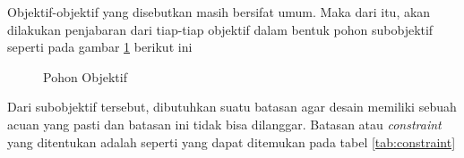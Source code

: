     Objektif-objektif yang disebutkan masih bersifat umum. Maka dari itu, akan dilakukan penjabaran dari tiap-tiap objektif dalam bentuk
    pohon subobjektif seperti pada gambar \ref{fig:obj_tree} berikut ini
    \begin{figure}[tbh]
        \centering
        
        \caption{Pohon Objektif}\label{fig:obj_tree}
    \end{figure}




    Dari subobjektif tersebut, dibutuhkan suatu batasan agar desain memiliki sebuah acuan yang pasti dan batasan ini tidak bisa dilanggar.
    Batasan atau \textit{constraint} yang ditentukan adalah seperti yang dapat ditemukan pada tabel \ref{tab:constraint}

